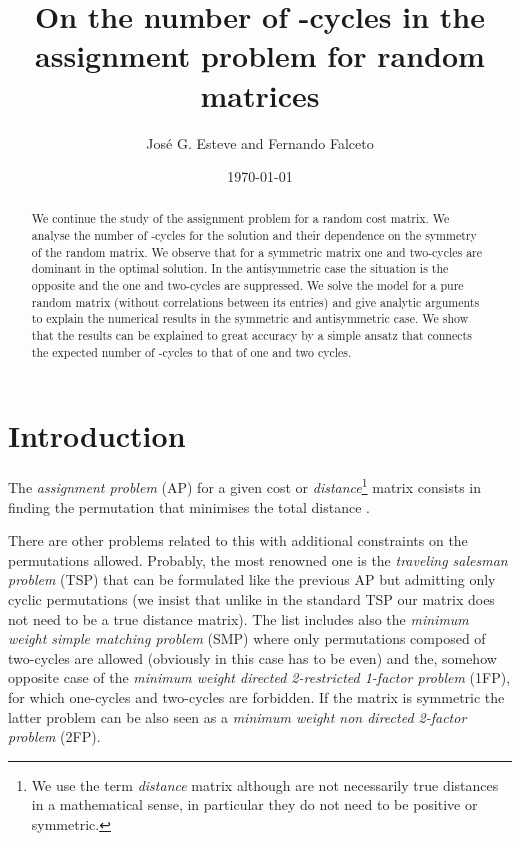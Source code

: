 \documentclass[]{iopart}
\begin{document}
\title{\bf{On the number of -cycles in the assignment problem 
for random matrices}}

\author{Jos\'e G. Esteve and Fernando Falceto  } 
\address{ Departamento de F\'{\i}sica Te\'orica, Facultad de Ciencias and \\
Instituto de Biocomputaci\'on y F\'{\i}sica de sistemas complejos.\\
Universidad de Zaragoza,
E-50009 Zaragoza (Spain)
}
\date{\today}



\begin{abstract}


We continue the study of the assignment problem
for a random cost matrix. We analyse the number of -cycles
for the solution and their dependence on the 
symmetry of the random matrix. We observe that for a
symmetric matrix one and two-cycles are dominant
in the optimal solution. In the antisymmetric case 
the situation is the opposite
and the one and two-cycles are suppressed.
We solve the model for a pure random matrix
(without correlations between its entries) 
and  give analytic arguments to explain
the  numerical results in the symmetric and 
antisymmetric case. We show that the results can be
explained to great accuracy by a simple
ansatz that connects the expected number of
-cycles to that of one and two cycles. 


\end{abstract}


\section{Introduction}

The {\it assignment problem} (AP) for a given cost or {\it distance}\footnote{We use the term {\it distance} matrix although  are not 
necessarily true distances in a mathematical sense,
in particular they do not need to be positive or symmetric.}
matrix 
consists in finding the permutation  that minimises
the total distance . 


There are other problems related to this 
with additional constraints on the permutations allowed.
Probably, the most renowned one is the {\it traveling salesman problem}
(TSP) that can be formulated like the previous AP but
admitting only cyclic permutations 
(we insist that unlike in the standard TSP
our matrix does not need to be a true distance matrix).
The list includes also the {\it minimum weight simple matching 
problem} (SMP)
where only permutations composed of two-cycles are allowed
(obviously in this case  has to be even) and the, somehow opposite case
of  the {\it minimum weight directed  2-restricted 1-factor problem} (1FP), 
for which one-cycles and two-cycles are 
forbidden. If the matrix is symmetric the latter problem can be also 
seen as a {\it minimum weight non directed 2-factor problem} (2FP).
 
\end{document}
